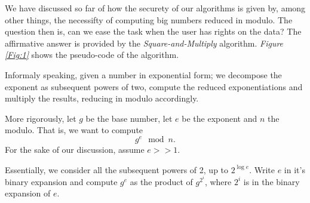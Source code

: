 \documentclass{subfiles}
\begin{document}
    We have discussed so far of how the securety of our algorithms is given by,
        among other things, the necessifty of computing big numbers reduced in modulo.
        The question then is, can we ease the task when the user has rights on the data?
        The affirmative answer is provided by the \emph{Square-and-Multiply} algorithm.
        \emph{Figure \ref{Fig:1}} shows the pseudo-code of the algorithm.

    Informaly speaking, given a number in exponential form; 
        we decompose the exponent as subsequent powers of two,
        compute the reduced exponentiations and multiply the results, reducing in modulo 
        accordingly.
        

    More rigorously, let \(g\) be the base number, let \(e\) be the exponent
        and \(n\) the modulo. That is, we want to compute
        \[
            g^{e} \mod{n}.
        \]
        For the sake of our  discussion, assume \(e >> 1\).
    
    Essentially, we consider all the subsequent powers of 2, up to 
        \(2^{\log{e}}\). Write \(e\) in it's binary expansion and 
        compute \(g^{e}\) as the product of \(g^{2^{i}}\), 
        where \(2^{i}\) is in the binary expansion of \(e\).
\end{document}
